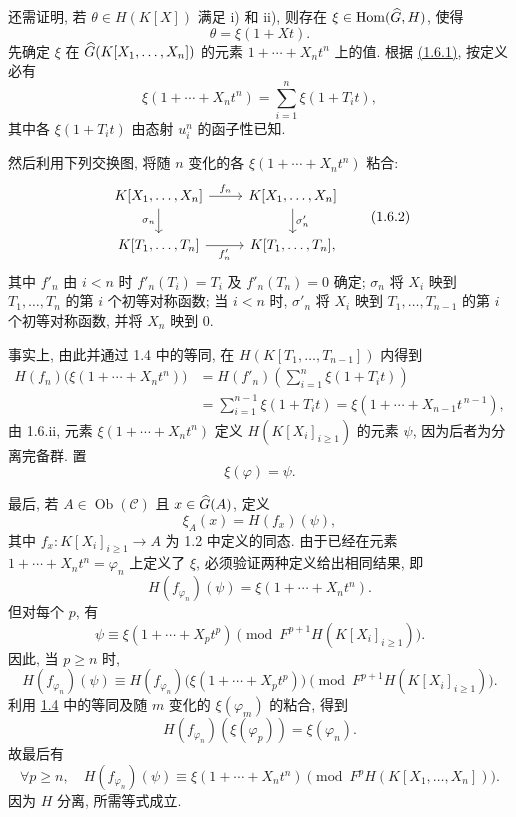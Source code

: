 还需证明, 若 \(\theta\in H(K[X])\) 满足 i) 和 ii), 则存在 \(\xi\in\operatorname{Hom}(\widehat G,H)\), 使得
\[
  \theta=\xi(1+Xt).
\]
先确定 \(\xi\) 在 \(\widehat G(K[X_1,\ldots,X_n])\) 的元素 \(1+\cdots+X_nt^n\) 上的值. 根据 \hyperlink{sga6.e05.eq.1-6-1}{(1.6.1)}, 按定义必有
\[
  \xi(1+\cdots+X_nt^n)
  =
  \sum_{i=1}^n \xi(1+T_it),
\]
其中各 \(\xi(1+T_it)\) 由态射 \(u_i^n\) 的函子性已知.

然后利用下列交换图, 将随 \(n\) 变化的各 \(\xi(1+\cdots+X_nt^n)\) 粘合:
\[
\begin{tikzcd}
K[X_1,\ldots,X_n] \arrow[r,"f_n"] \arrow[d,"\sigma_n"'] &
K[X_1,\ldots,X_n] \arrow[d,"\sigma'_n"]\\
K[T_1,\ldots,T_n] \arrow[r,"f'_n"'] &
K[T_1,\ldots,T_n],
\end{tikzcd}
\tag{1.6.2}
\]
其中 \(f'_n\) 由 \(i<n\) 时 \(f'_n(T_i)=T_i\) 及 \(f'_n(T_n)=0\) 确定; \(\sigma_n\) 将 \(X_i\) 映到 \(T_1,\ldots,T_n\) 的第 \(i\) 个初等对称函数; 当 \(i<n\) 时, \(\sigma'_n\) 将 \(X_i\) 映到 \(T_1,\ldots,T_{n-1}\) 的第 \(i\) 个初等对称函数, 并将 \(X_n\) 映到 \(0\).

事实上, 由此并通过 1.4 中的等同, 在 \(H(K[T_1,\ldots,T_{n-1}])\) 内得到
\[
\begin{aligned}
H(f_n)\bigl(\xi(1+\cdots+X_nt^n)\bigr)
&=H(f'_n)\left(\sum_{i=1}^n \xi(1+T_it)\right)\\
&=\sum_{i=1}^{n-1}\xi(1+T_it)
   =\xi(1+\cdots+X_{n-1}t^{\,n-1}),
\end{aligned}
\]
由 1.6.ii, 元素 \(\xi(1+\cdots+X_nt^n)\) 定义 \(H(K[X_i]_{i\geq 1})\) 的元素 \(\psi\), 因为后者为分离完备群. 置
\[
  \xi(\varphi)=\psi .
\]

最后, 若 \(A\in\operatorname{Ob}(\mathcal C)\) 且 \(x\in\widehat G(A)\), 定义
\[
  \xi_A(x)=H(f_x)(\psi),
\]
其中 \(f_x:K[X_i]_{i\geq 1}\to A\) 为 1.2 中定义的同态. 由于已经在元素 \(1+\cdots+X_nt^n=\varphi_n\) 上定义了 \(\xi\), 必须验证两种定义给出相同结果, 即
\[
  H(f_{\varphi_n})(\psi)=\xi(1+\cdots+X_nt^n).
\]
但对每个 \(p\), 有
\[
  \psi\equiv \xi(1+\cdots+X_pt^p)
  \pmod{F^{p+1}H(K[X_i]_{i\geq 1})}.
\]
因此, 当 \(p\geq n\) 时,
\[
  H(f_{\varphi_n})(\psi)
  \equiv
  H(f_{\varphi_n})\bigl(\xi(1+\cdots+X_pt^p)\bigr)
  \pmod{F^{p+1}H(K[X_i]_{i\geq 1})}.
\]
利用 \hyperlink{sga6.e05.para.1-4}{1.4} 中的等同及随 \(m\) 变化的 \(\xi(\varphi_m)\) 的粘合, 得到
\[
  H(f_{\varphi_n})(\xi(\varphi_p))=\xi(\varphi_n).
\]
故最后有
\[
  \forall p\geq n,\quad
  H(f_{\varphi_n})(\psi)\equiv \xi(1+\cdots+X_nt^n)
  \pmod{F^pH(K[X_1,\ldots,X_n])}.
\]
因为 \(H\) 分离, 所需等式成立.

